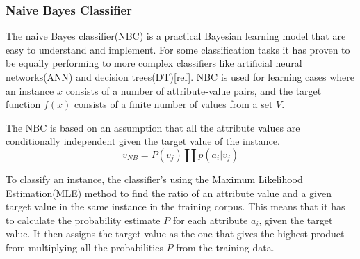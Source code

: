 \subsubsection{Naive Bayes Classifier}
		The naive Bayes classifier(NBC) is a practical Bayesian learning model that are easy to understand and implement. For some classification tasks it has proven to be equally performing to more complex classifiers like artificial neural networks(ANN) and decision trees(DT)[ref]. NBC is used for learning cases where an instance $x$ consists of a number of attribute-value pairs, and the target function $f(x)$ consists of a finite number of values from a set $V$.

The NBC is based on an assumption that all the attribute values are conditionally independent given the target value of the instance.
\begin{equation}
\label{equation:nbc}
v_{NB} = P(v_j) \amalg p(a_i|v_j)
\end{equation}

To classify an instance, the classifier's using the Maximum Likelihood Estimation(MLE) method to find the ratio of an attribute value and a given target value in the same instance in the training corpus. This means that it has to calculate the probability estimate $P$ for each attribute $a_i$, given the target value. It then assigns the target value as the one that gives the highest product from multiplying all the probabilities $P$ from the training data.